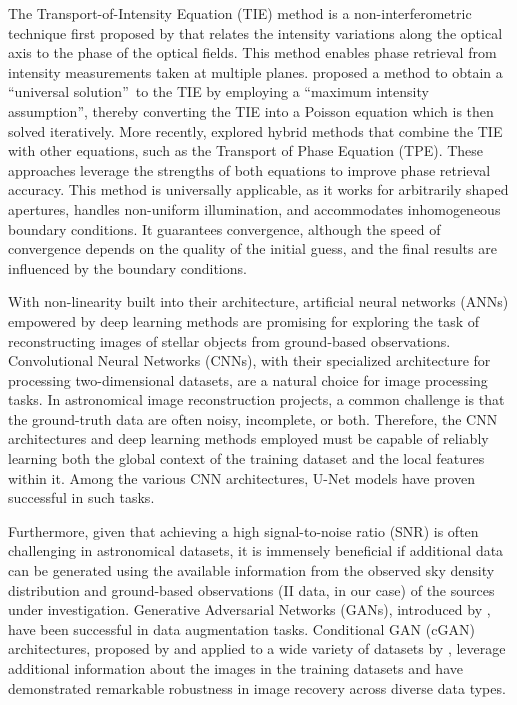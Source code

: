 The Transport-of-Intensity Equation (TIE) method is a non-interferometric technique first proposed by \cite{Teague1983} that relates the intensity variations along the optical axis to the phase of the optical fields. This method enables phase retrieval from intensity measurements taken at multiple planes. \cite{Zhang2020} proposed a method to obtain a \textquotedblleft universal solution\textquotedblright\ to the TIE by employing a \textquotedblleft maximum intensity assumption\textquotedblright, thereby converting the TIE into a Poisson equation which is then solved iteratively. More recently, \cite{Kirisits2024} explored hybrid methods that combine the TIE with other equations, such as the Transport of Phase Equation (TPE). These approaches leverage the strengths of both equations to improve phase retrieval accuracy. This method is universally applicable, as it works for arbitrarily shaped apertures, handles non-uniform illumination, and accommodates inhomogeneous boundary conditions. It guarantees convergence, although the speed of convergence depends on the quality of the initial guess, and the final results are influenced by the boundary conditions.

With non-linearity built into their architecture, artificial neural networks (ANNs) empowered by deep learning methods are promising for exploring the task of reconstructing images of stellar objects from ground-based observations. Convolutional Neural Networks (CNNs), with their specialized architecture for processing two-dimensional datasets, are a natural choice for image processing tasks. In astronomical image reconstruction projects, a common challenge is that the ground-truth data are often noisy, incomplete, or both. Therefore, the CNN architectures and deep learning methods employed must be capable of reliably learning both the global context of the training dataset and the local features within it. Among the various CNN architectures, U-Net models \citep{ronneberger2015u} have proven successful in such tasks.

Furthermore, given that achieving a high signal-to-noise ratio (SNR) is often challenging in astronomical datasets, it is immensely beneficial if additional data can be generated using the available information from the observed sky density distribution and ground-based observations (II data, in our case) of the sources under investigation. Generative Adversarial Networks (GANs), introduced by \cite{goodfellow2014generative}, have been successful in data augmentation tasks. Conditional GAN (cGAN) architectures, proposed by \cite{mirza2014conditional} and applied to a wide variety of datasets by \cite{isola2017image}, leverage additional information about the images in the training datasets and have demonstrated remarkable robustness in image recovery across diverse data types.

